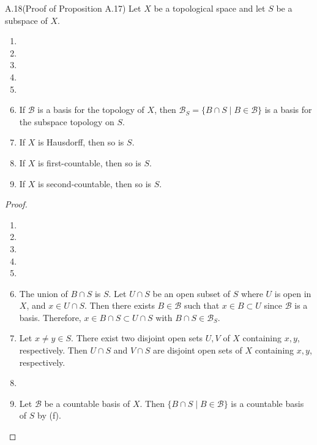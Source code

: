 \begin{customexer}{A.18(Proof of Proposition A.17)}\label{exercise_a_18}
  Let $X$ be a topological space and let $S$ be a subspace of $X$.
  \begin{enumerate}[label=(\alph*)]
    \item 
    \item 
    \item 
    \item 
    \item 
    \item 
      If $\mathcal{B}$ is a basis for the topology of $X$, then $\mathcal{B}_S = \{ B \cap S \mid B \in \mathcal{B} \}$ is a basis for the subspace topology on $S$.
    \item 
      If $X$ is Hausdorff, then so is $S$.
    \item 
      If $X$ is first-countable, then so is $S$.
    \item 
      If $X$ is second-countable, then so is $S$.
  \end{enumerate}
\end{customexer}

\begin{proof}
  $ $
  \begin{enumerate}[label=(\alph*)]
    \item 
    \item 
    \item 
    \item 
    \item 
    \item 
      The union of $B \cap S$ is $S$.
      Let $U \cap S$ be an open subset of $S$ where $U$ is open in $X$, and $x \in U \cap S$.
      Then there exists $B \in \mathcal{B}$ such that $x \in B \subset U$ since $\mathcal{B}$ is a basis.
      Therefore, $x \in B \cap S \subset U \cap S$ with $B \cap S \in \mathcal{B}_S$.
    \item 
      Let $x \ne y \in S$.
      There exist two disjoint open sets $U, V$ of $X$ containing $x, y$, respectively.
      Then $U \cap S$ and $V \cap S$ are disjoint open sets of $X$ containing $x, y$, respectively.
    \item 
    \item 
      Let $\mathcal{B}$ be a countable basis of $X$.
      Then $\{ B \cap S \mid B \in \mathcal{B} \}$ is a countable basis of $S$ by (f).
  \end{enumerate}
\end{proof}
